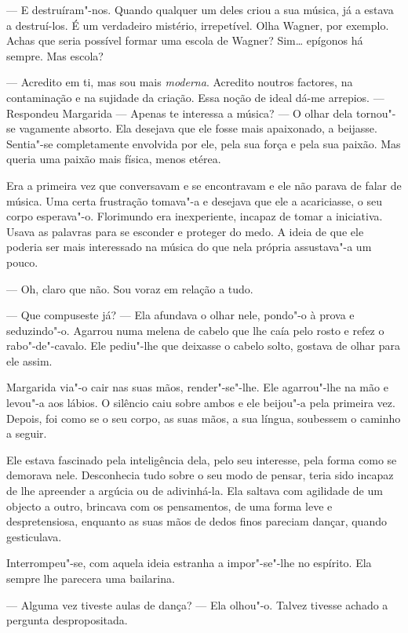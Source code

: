 --- E destruíram"-nos. Quando qualquer um deles criou a sua música, já a
estava a destruí-los. É um verdadeiro mistério, irrepetível. Olha
Wagner, por exemplo. Achas que seria possível formar uma escola de
Wagner? Sim\ldots{} epígonos há sempre. Mas escola?

--- Acredito em ti, mas sou mais \emph{moderna}. Acredito noutros factores, na
contaminação e na sujidade da criação. Essa noção de ideal dá-me
arrepios. --- Respondeu Margarida --- Apenas te interessa a música? --- O
olhar dela tornou"-se vagamente absorto. Ela desejava que ele fosse mais
apaixonado, a beijasse. Sentia"-se completamente envolvida por ele, pela
sua força e pela sua paixão. Mas queria uma paixão mais física, menos
etérea.

Era a primeira vez que conversavam e se encontravam e ele não parava de
falar de música. Uma certa frustração tomava"-a e desejava que ele a
acariciasse, o seu corpo esperava"-o. Florimundo era inexperiente,
incapaz de tomar a iniciativa. Usava as palavras para se esconder e
proteger do medo. A ideia de que ele poderia ser mais interessado na
música do que nela própria assustava"-a um pouco.

--- Oh, claro que não. Sou voraz em relação a tudo.

--- Que compuseste já? --- Ela afundava o olhar nele, pondo"-o à prova e
seduzindo"-o. Agarrou numa melena de cabelo que lhe caía pelo rosto e
refez o rabo"-de"-cavalo. Ele pediu"-lhe que deixasse o cabelo solto,
gostava de olhar para ele assim.

Margarida via"-o cair nas suas mãos, render"-se"-lhe. Ele agarrou"-lhe na
mão e levou"-a aos lábios. O silêncio caiu sobre ambos e ele beijou"-a
pela primeira vez. Depois, foi como se o seu corpo, as suas mãos, a sua
língua, soubessem o caminho a seguir.

Ele estava fascinado pela inteligência dela, pelo seu interesse, pela
forma como se demorava nele. Desconhecia tudo sobre o seu modo de
pensar, teria sido incapaz de lhe apreender a argúcia ou de adivinhá-la.
Ela saltava com agilidade de um objecto a outro, brincava com os
pensamentos, de uma forma leve e despretensiosa, enquanto as suas mãos
de dedos finos pareciam dançar, quando gesticulava.

Interrompeu"-se, com aquela ideia estranha a impor"-se"-lhe no espírito.
Ela sempre lhe parecera uma bailarina.

--- Alguma vez tiveste aulas de dança? --- Ela olhou"-o. Talvez tivesse
achado a pergunta despropositada.

